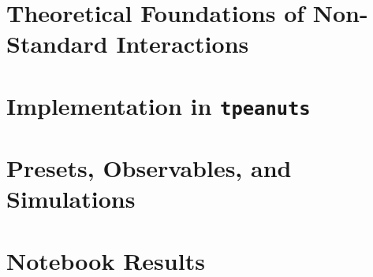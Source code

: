 \documentclass[11pt,a4paper,openany]{report}
\begin{document}
\tableofcontents
{}
\clearpage
{}

\chapter{Theoretical Foundations of Non-Standard Interactions}


\chapter{Implementation in \texttt{tpeanuts}}


\chapter{Presets, Observables, and Simulations}


\chapter{Notebook Results}


\clearpage
\printbibliography[title={References}]
\end{document}
